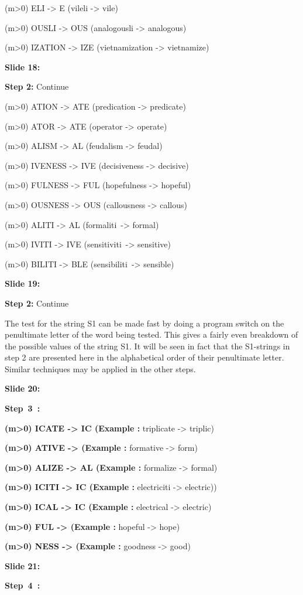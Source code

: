 \documentclass[11pt,a4paper]{article}
\begin{document}
(m>0) ELI -> E (vileli -> vile)

(m>0) OUSLI -> OUS (analogousli -> analogous)

(m>0) IZATION -> IZE (vietnamization -> vietnamize)

\textbf{Slide 18:}

\textbf{Step 2:} Continue

(m>0) ATION -> ATE (predication -> predicate)

(m>0) ATOR -> ATE (operator -> operate)

(m>0) ALISM -> AL (feudalism -> feudal)

(m>0) IVENESS -> IVE (decisiveness -> decisive)

(m>0) FULNESS -> FUL (hopefulness -> hopeful)

(m>0) OUSNESS -> OUS (callousness -> callous)

(m>0) ALITI -> AL (formaliti -> formal)

(m>0) IVITI -> IVE (sensitiviti -> sensitive)

(m>0) BILITI -> BLE (sensibiliti -> sensible)

\textbf{Slide 19:}

\textbf{Step 2:} Continue

The test for the string S1 can be made fast by doing a program switch on the penultimate letter of the word being tested. This gives a fairly even breakdown of the possible values of the string S1. It will be seen in fact that the S1-strings in step 2 are presented here in the alphabetical order of their penultimate letter. Similar techniques may be applied in the other steps.

\textbf{Slide 20:}

\textbf{Step 3 :} 

\textbf{(m>0) ICATE -> IC (Example :}  triplicate -> triplic)

\textbf{(m>0) ATIVE -> (Example :}  formative -> form)

\textbf{(m>0) ALIZE -> AL (Example :}  formalize -> formal)

\textbf{(m>0) ICITI -> IC (Example :}  electriciti -> electric))

\textbf{(m>0) ICAL -> IC (Example :}  electrical -> electric)

\textbf{(m>0) FUL -> (Example :}  hopeful -> hope)

\textbf{(m>0) NESS -> (Example :}  goodness -> good)

\textbf{Slide 21:}

\textbf{Step 4 :} 
\end{document}
